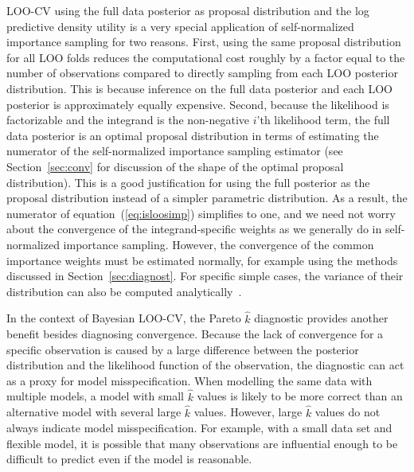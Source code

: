 \documentclass[12pt]{article}
\begin{document}
LOO-CV using the full data posterior as proposal distribution and
the log predictive density utility is a very special application
of self-normalized importance sampling for two reasons.
First, using the same proposal distribution for all LOO folds reduces the computational cost roughly by a factor equal to the number of observations
compared to directly sampling from each LOO posterior distribution. This is because
inference on the full data posterior and each LOO posterior is approximately equally expensive.
Second, because the likelihood is factorizable and the integrand is the non-negative $i$'th likelihood term,
the full data posterior is an optimal proposal distribution in terms of estimating the
numerator of the self-normalized importance sampling estimator (see Section~\ref{sec:conv} for discussion of the shape of the optimal proposal distribution).
This is a good justification for using the full posterior as the proposal distribution
instead of a simpler parametric distribution.
As a result, the numerator of equation~(\ref{eq:isloosimp}) simplifies to one,
and we need not worry about the convergence of the integrand-specific weights as we generally do in self-normalized importance sampling.
However,
the convergence of the common importance weights must be estimated normally, for example
using the methods discussed in Section~\ref{sec:diagnost}.
For specific simple cases, the variance of their distribution can also be computed analytically~\citep{peruggia1997variability,epifani2008case,pitt2013existence}.














In the context of Bayesian LOO-CV, the Pareto $\hat{k}$ diagnostic
provides another benefit besides diagnosing convergence.
Because the lack of convergence for a specific observation is caused
by a large difference between the posterior distribution
and the likelihood function of the observation, the diagnostic can act as a proxy for model
misspecification. When modelling the same data with multiple models,
a model with small $\hat{k}$ values is likely to be
more correct than an alternative model with several large $\hat{k}$ values.
%
%
However, large $\hat{k}$ values do not always indicate
model misspecification. For example, with a
small data set and flexible model, it is possible that many observations are influential enough
to be difficult to predict even if the model is reasonable.
\end{document}
